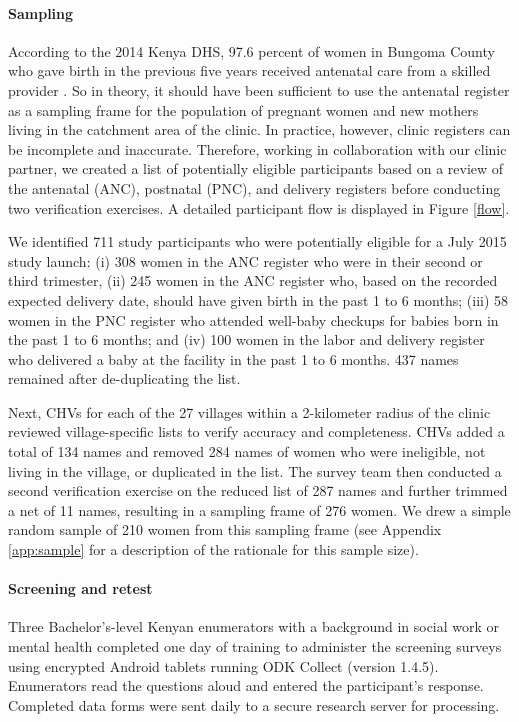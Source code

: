 \documentclass[man,natbib,longtable]{apa6}\usepackage[]{graphicx}\usepackage[]{color}
\begin{document}
\paragraph{Sampling}

According to the 2014 Kenya DHS, 97.6 percent of women in Bungoma County who gave birth in the previous five years received antenatal care from a skilled provider \citep{KNBS:2015}. So in theory, it should have been sufficient to use the antenatal register as a sampling frame for the population of pregnant women and new mothers living in the catchment area of the clinic. In practice, however, clinic registers can be incomplete and inaccurate. Therefore, working in collaboration with our clinic partner, we created a list of potentially eligible participants based on a review of the antenatal (ANC), postnatal (PNC), and delivery registers before conducting two verification exercises. A detailed participant flow is displayed in Figure \ref{flow}.

We identified 711 study participants who were potentially eligible for a July 2015 study launch: (i) 308 women in the ANC register who were in their second or third trimester, (ii) 245 women in the ANC register who, based on the recorded expected delivery date, should have given birth in the past 1 to 6 months; (iii) 58 women in the PNC register who attended well-baby checkups for babies born in the past 1 to 6 months; and (iv) 100 women in the labor and delivery register who delivered a baby at the facility in the past 1 to 6 months. 437 names remained after de-duplicating the list. 

Next, CHVs for each of the 27 villages within a 2-kilometer radius of the clinic reviewed village-specific lists to verify accuracy and completeness. CHVs added a total of 134 names and removed 284 names of women who were ineligible, not living in the village, or duplicated in the list. The survey team then conducted a second verification exercise on the reduced list of 287 names and further trimmed a net of 11 names, resulting in a sampling frame of 276 women. We drew a simple random sample of 210 women from this sampling frame (see Appendix \ref{app:sample} for a description of the rationale for this sample size). 

\paragraph{Screening and retest}

Three Bachelor's-level Kenyan enumerators with a background in social work or mental health completed one day of training to administer the screening surveys using encrypted Android tablets running ODK Collect (version 1.4.5). Enumerators read the questions aloud and entered the participant's response. Completed data forms were sent daily to a secure research server for processing.
\end{document}
